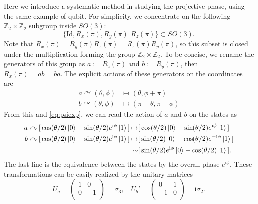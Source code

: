 \documentclass[
]{scrartcl}
\numberwithin{equation}{section}
\theoremstyle{definition}
\theoremstyle{definition}
\theoremstyle{definition}
\theoremstyle{definition}
\theoremstyle{remark}
\begin{document}
Here we introduce a systematic method in studying the projective phase,
using the same example of qubit.
For simplicity, we concentrate on the following \(\mathbb{Z}_2\times \mathbb{Z}_2\) subgroup inside \(SO(3)\):
\begin{equation}
  \label{eq:Z2Z2}
  \{\mathrm{Id}, R_x(\pi), R_y(\pi), R_z(\pi)\} \subset SO(3).
\end{equation}
Note that \(R_x(\pi) = R_y(\pi)R_z(\pi) = R_z(\pi)R_y(\pi)\), so this subset is closed under the multiplication forming the group \(\mathbb{Z}_2\times \mathbb{Z}_2\).
To be concise, we rename the generators of this group as \(a := R_z(\pi)\) and \(b := R_y(\pi)\), then \(R_x(\pi) = ab = ba\).
The explicit actions of these generators on the coordinates are
\begin{align}
  \label{eq:Rxyactions}
  a \curvearrowright (\theta,\phi) &\mapsto (\theta,\phi+\pi)\\
  b \curvearrowright (\theta,\phi) &\mapsto (\pi-\theta,\pi-\phi)
\end{align}
From this and \eqref{eq:psiexp}, we can read the action of \(a\) and \(b\) on the states as
\begin{align}
  \label{eq:abActionPsi}
  a \curvearrowright [\, \cos(\theta/2)\ket{0} + \sin(\theta/2) e^{\mathrm{i}\phi}\ket{1} \,] \mapsto & [\, \cos(\theta/2)\ket{0} - \sin(\theta/2) e^{\mathrm{i}\phi}\ket{1} \,]\\
  b \curvearrowright [\, \cos(\theta/2)\ket{0} + \sin(\theta/2) e^{\mathrm{i}\phi} \ket{1}\,] \mapsto & [\, \sin(\theta/2)\ket{0} - \cos(\theta/2) e^{-\mathrm{i}\phi}\ket{1} \,]\\
   \sim  & [\, \sin(\theta/2)e^{\mathrm{i}\phi}\ket{0} - \cos(\theta/2) \ket{1} \,].
\end{align}
The last line is the equivalence between the states by the overall phase \(e^{\mathrm{i}\phi}\).
These transformations can be easily realized by the unitary matrices
\begin{equation}
  \label{eq:UaUbZ2Z2}
  U_a = 
  \begin{pmatrix}
    1 & 0 \\
    0 & -1 \\
  \end{pmatrix} = \sigma_3,\quad
  U_b' = 
  \begin{pmatrix}
    0 & 1 \\
    -1 & 0 \\
  \end{pmatrix} = \mathrm{i}\sigma_2.
\end{equation}
\end{document}
